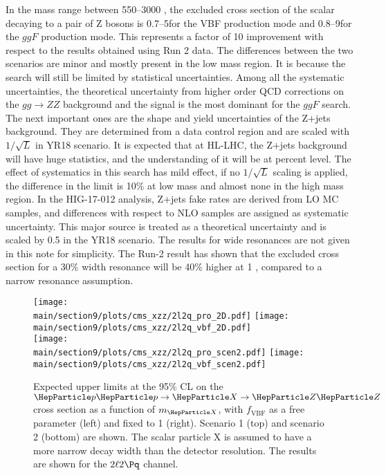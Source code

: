 In the mass range between 550--3000 \UGeV, the excluded cross section of the scalar decaying to a pair of Z bosons is 0.7--5\fb for the VBF production mode and 0.8--9\fb for the $ggF$ production mode. This represents a factor of 10 improvement with respect to the results obtained using Run 2 data. The differences between the two scenarios are minor and mostly present in the low mass region. It is because the search will still be limited by statistical uncertainties. Among all the systematic uncertainties, the theoretical uncertainty from higher order QCD corrections on the $gg\to ZZ$ background and the signal is the most dominant for the $ggF$ search. The next important ones are the shape and yield uncertainties of the Z$+$jets background. They are determined from a data control region and are scaled with $1/\sqrt{L}$ in YR18 scenario. It is expected that at HL-LHC, the Z$+$jets background will have huge statistics, and the understanding of it will be at percent level. The effect of systematics in this search has mild effect, if no $1/\sqrt{L}$ scaling is applied, the difference in the limit is 10\% at low mass and almost none in the high mass region. In the HIG-17-012 analysis, Z$+$jets fake rates are derived from LO MC samples, and differences with respect to NLO samples are assigned as systematic uncertainty. This major source is treated as a theoretical uncertainty and is scaled by 0.5 in the YR18 scenario. 
The results for wide resonances are not given in this note for simplicity. The Run-2 result has shown that the excluded cross section for a 30\% width resonance will be 40\% higher at 1 \UTeV, compared to a narrow resonance assumption. 

\begin{figure}[htbp]
  \centering
  \texttt{[image: \\main/section9/plots/cms\_xzz/2l2q\_pro\_2D.pdf]}
  \texttt{[image: \\main/section9/plots/cms\_xzz/2l2q\_vbf\_2D.pdf]}\\
  \texttt{[image: \\main/section9/plots/cms\_xzz/2l2q\_pro\_scen2.pdf]}
  \texttt{[image: \\main/section9/plots/cms\_xzz/2l2q\_vbf\_scen2.pdf]}
  \caption{Expected upper limits at the 95\% CL on the
    $\Pp\Pp\to\PX\to\PZ\PZ$ cross section as a function of $m_{\PX}$,
    with $f_{\mathrm{VBF}}$ as a free parameter (left) and fixed to 1
    (right). Scenario 1 (top) and scenario 2 (bottom) are shown. The
    scalar particle X is assumed to have a more narrow decay width
    than the detector resolution. The results are shown for the
    $2\ell2\Pq$ channel.\label{fig:combinedresult}}
\end{figure}
